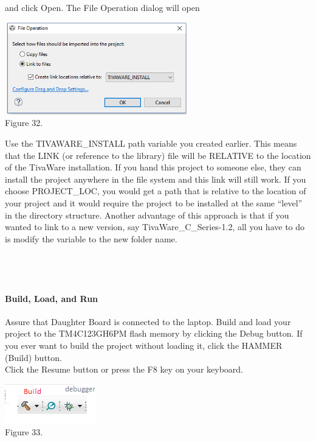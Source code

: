 \documentclass[a4paper,10pt,oneside]{article}
\begin{document}
					and click Open. The File Operation dialog will open \\
					\begin{center}
						\includegraphics[width=8cm, height=4cm]{Images/driverlib}\\
						Figure 32.
					\end{center}
					Use the TIVAWARE\_INSTALL path variable you created earlier. This means that the LINK
					(or reference to the library) file will be RELATIVE to the location of the TivaWare
					installation. If you hand this project to someone else, they can install the project anywhere in
					the file system and this link will still work. If you choose PROJECT\_LOC, you would get a
					path that is relative to the location of your project and it would require the project to be
					installed at the same “level” in the directory structure. Another advantage of this approach is 
					that if you wanted to link to a new version, say TivaWare\_C\_Series-1.2, all you have
					to do is modify the variable to the new folder name.\\ 
					\\
					\\
					\\
					\paragraph{\textbf{Build, Load, and Run }}
					Assure that Daughter Board is connected to the laptop. Build and load your project to the TM4C123GH6PM flash memory by clicking the Debug button. If you ever want to build the project without loading it, click the HAMMER (Build) button. \\
					Click the Resume button or press the F8 key on your keyboard.
					\begin{center}
					\includegraphics{Images/debugger}\\
					Figure 33.\\
					\end{center}
\end{document}
